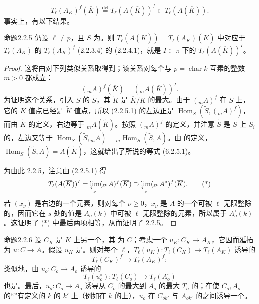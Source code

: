 \[T_\ell(A_K)^f(\overline K)\overset{\mathrm{def}}=T_\ell(A(\overline K))^f\subset T_\ell(A(\overline K)).\tag{2.2.4.1}\]
事实上，有以下结果。
\begin{SGAresult}{命题}{2.2.5}
仍设 $\ell\ne p$，且 $S$ 为。则 $T_\ell(A(\overline K))=T_\ell(A_K)(\overline K)$ 中对应于 $T_\ell(A_K)$ 的 $T_\ell(A_K)^f$ (2.2.3.4) 的 (2.2.4.1)，就是 $I\subset\pi$ 下的 $T_\ell(A(\overline K))^I$。
\end{SGAresult}
\begin{proof}
这将由对下列类似关系取得到；该关系对每个与 $p=\operatorname{char}k$ 互素的整数 $m>0$ 都成立：
\[({}_mA)^f(\overline K)=({}_mA(\overline K))^I.\tag{2.2.5.1}\]
为证明这个关系，引入 $S$ 的 $\widetilde S$，其 $\widetilde K$ 是 $\overline K/K$ 的最大。由于 $({}_mA)^f$ 在 $S$ 上，它的 $\overline K$ 值点已经是 $\widetilde K$ 值点，所以 (2.2.5.1) 的左边正是 $\operatorname{Hom}_S(\widetilde S,({}_mA)^f)$，而由 $\widetilde K$ 的定义，右边等于 ${}_mA(\widetilde K)$。按照 $({}_mA)^f$ 的定义，并注意 $\widetilde S$ 是 $S$ 上 $S_i$ 的，左边又等于 $\operatorname{Hom}_S(\widetilde S,{}_mA)={}_m\operatorname{Hom}_S(\widetilde S,A)$。由 的定义，$\operatorname{Hom}_S(\widetilde S,A)=A(\widetilde K)$，这就给出了所说的等式 (6.2.5.1)。

为由此 2.2.5，注意由 (2.2.5.1) 得
\[T_\ell(A(\overline K))^I=\varprojlim_\nu({}_{\ell^\nu}A)^f(\overline K)\supset\varprojlim_\nu({}_{\ell^\nu}A^\circ)^f(\overline K).\tag{*}\]
若 $(x_\nu)$ 是右边的一个元素，则对每个 $\nu\ge0$，$x_\nu$ 是 $A$ 的一个可被 $\ell$ 无限整除的，因而它在 $s$ 处的值是 $A_o(k)$ 中可被 $\ell$ 无限整除的元素，所以属于 $A_o^\circ(k)$。这证明了 (*) 中最后两项相等，从而证明了 2.2.5。
\end{proof}
\begin{SGAresult}{命题}{2.2.6}
设 $C_K$ 是 $K$ 上另一个，其 为 $C$；考虑一个 $u_K:C_K\to A_K$，它因而延拓为 $u:C\to A$。假设 $u_K$ 是。则对每个 $\ell$，$T_\ell(u_K):T_\ell(C_K)\to T_\ell(A_K)$ 诱导的
\[T_\ell(C_K)^f\longrightarrow T_\ell(A_K)^f;\tag{2.2.6.1}\]
类似地，由 $u_o:C_o\to A_o$ 诱导的
\[T_\ell(u_o^\circ):T_\ell(C_o^\circ)\longrightarrow T_\ell(A_o^\circ)\tag{2.2.6.2}\]
也是。最后，$u_o:C_o\to A_o$ 诱导从 $C_o$ 的最大到 $A_o$ 的最大 $T_o$ 的；在使 $C_o,A_o$ 的“”有定义的 $k$ 的 $k'$ 上（例如在 $k$ 的上），$u_o$ 在 $C_{ok'}$ 与 $A_{ok'}$ 的之间诱导一个。
\end{SGAresult}
